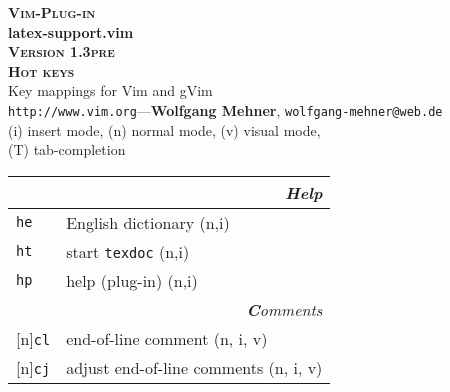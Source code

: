 \documentclass[oneside,10pt,landscape,DIV16]{scrartcl}
\newcommand{\Pluginversion}{1.3pre}
\newcommand{\Rep}{{\scriptsize{[n]}}}
\newcommand{\Map}[1] {\textbf{\textasciiacute}\texttt{#1}}
\begin{document}
\begin{multicols}{3}
\begin{center}
%
\textbf{\textsc{\small{Vim-Plug-in}}}\\
\textbf{\LARGE{latex-support.vim}}\\
\textbf{\textsc{\small{Version \Pluginversion}}}\\
\vspace{1mm}%
\textbf{\textsc{\Huge{Hot keys}}}\\
\vspace{1mm}%
Key mappings for Vim and gVim\\
{\tiny  \texttt{http://www.vim.org}\hspace{1.5mm}---\hspace{1.5mm}\textbf{Wolfgang Mehner},  \texttt{wolfgang-mehner@web.de}}\\
\vspace{1.0mm}
{\normalsize (i)} insert mode, {\normalsize (n)} normal mode, {\normalsize (v)} visual mode,\\
{\normalsize (T)} tab-completion
\vspace{1.0mm}
%
\begin{tabular}[]{|p{11mm}|p{60mm}|}
\hline
\multicolumn{2}{|r|}{\textsl{\textbf{H}elp}}\\[1.0ex]
\hline \Map{he}   & English dictionary              \hfill (n,i)\\
\hline \Map{ht}   & start \texttt{texdoc}           \hfill (n,i)\\
\hline \Map{hp}   & help (plug-in)                  \hfill (n,i)\\
\hline
\hline
\multicolumn{2}{|r|}{\textsl{\textbf{C}omments}}    \\[1.0ex]
\hline \Rep\Map{cl}   & end-of-line comment         \hfill (n, i, v)\\
\hline \Rep\Map{cj}   & adjust end-of-line comments \hfill (n, i, v)\\

\end{tabular}
\end{center}
\end{multicols}
\end{document}
